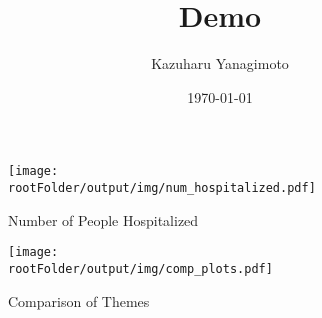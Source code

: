 \documentclass[a4paper,12pt]{article}
\newcommand{\rootFolder}{./../..}
\begin{document}
\title{Demo}
\author{Kazuharu Yanagimoto}

\date{\today}
\maketitle

\begin{figure}
    \centering
    \caption{Number of People Hospitalized}
    \texttt{[image: \\rootFolder/output/img/num\_hospitalized.pdf]}
\end{figure}

\begin{figure}
    \centering
    \caption{Comparison of Themes}
    \texttt{[image: \\rootFolder/output/img/comp\_plots.pdf]}
\end{figure}


\begin{table}
    \centering
    \caption{Number of Persons Involved in Traffic Accidents}
    
\end{table}

\begin{table}
    \centering
    \caption{Logit Regression of Hospitalization and Death within 24 Hours}
    
    \caption*{Notes: Passenger and pedestrian's coefficients are normalized by driver.
    **p<.01; *p<.05; +p<.1. Standard errors are clustered by age group.}
\end{table}
\end{document}
